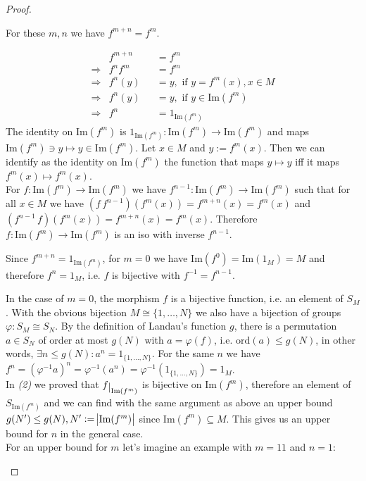 \begin{proof}[Proof\nopunct]
\begin{subproof}[of (1)]
For these $m,n$ we have $f^{m+n} = f^{m}$.
\end{subproof}
\begin{subproof}[Proof of (2).]
\begin{align*}
&f^{m+n} &&= f^{m} \\
\Rightarrow &f^{n}f^{m} &&= f^{m} \\
\Rightarrow &f^{n}(y) &&= y, \text{ if } y = f^{m}(x), x \in M \\
\Rightarrow &f^{n}(y) &&= y, \text{ if } y \in \mathrm{Im}(f^{m}) \\
\Rightarrow &f^{n} &&= 1_{\mathrm{Im}(f^{m})}
\end{align*}
The identity on $\mathrm{Im}(f^{m})$ is $1_{\mathrm{Im}(f^{m})} : \mathrm{Im}(f^{m}) \rightarrow \mathrm{Im}(f^{m})$
and maps $\mathrm{Im}(f^{m})\ni y \mapsto y \in \mathrm{Im}(f^{m})$.
Let $x \in M$ and $y := f^{m}(x)$. Then we can identify as the identity on $\mathrm{Im}(f^{m})$ the function
that maps $y \mapsto y$ iff it maps $f^{m}(x) \mapsto f^{m}(x)$.\\
For $f : \mathrm{Im}(f^{m}) \rightarrow \mathrm{Im}(f^{m})$ we have
$f^{n-1} : \mathrm{Im}(f^{m}) \rightarrow \mathrm{Im}(f^{m})$ such that for all
$x \in M$ we have $(f\,f^{n-1})(f^{m}(x)) = f^{m+n}(x) = f^{m}(x)$ and
$(f^{n-1}\,f)(f^{m}(x)) = f^{m+n}(x) = f^{m}(x)$. Therefore $f : \mathrm{Im}(f^{m}) \rightarrow \mathrm{Im}(f^{m})$
is an iso with inverse $f^{n-1}$.
\end{subproof}
\begin{subproof}[Proof of (3).]
Since $f^{m+n} = 1_{\mathrm{Im}(f^{m})}$, for $m = 0$ we have
$\mathrm{Im}(f^{0}) = \mathrm{Im}(1_{M}) = M$ and therefore
$f^{n} = 1_{M}$, i.e. $f$ is bijective with $f^{-1} = f^{n-1}$.
\end{subproof}
\begin{subproof}[Proof of (4).]
In the case of $m = 0$, the morphism $f$ is a bijective function, i.e. an element of $S_{M}$. With the obvious
bijection $M \cong \{1,\dots,N\}$ we also have a bijection of groups $\varphi : S_{M} \cong S_{N}$. By the definition
of Landau's function $g$, there is a permutation $a \in S_{N}$ of order at most $g(N)$ with $a = \varphi(f)$, i.e.
$\mathrm{ord}(a) \leq g(N)$, in other words, $\exists n\leq g(N) : a^{n} = 1_{\{1,\dots,N\}}$. For the same $n$ we have
$f^{n} = (\varphi^{-1}a)^{n} = \varphi^{-1}(a^{n}) = \varphi^{-1}(1_{\{1,\dots,N\}}) = 1_{M}$.\\
In \textit{(2)} we proved that $f\restrict{\mathrm{Im}(f^{m})}$ is bijective on $\mathrm{Im}(f^{m})$, therefore an element of
$S_{\mathrm{Im}(f^{m})}$ and we can find with the same argument as above an upper bound $g(N') \leq g(N), N' := \abs{\mathrm{Im}(f^{m})}$
since $\mathrm{Im}(f^{m}) \subseteq M$. This gives us an upper bound for $n$ in the general case.\\
For an upper bound for $m$ let's imagine an example with $m=11$ and $n=1$:\\


\end{subproof}
\end{proof}
